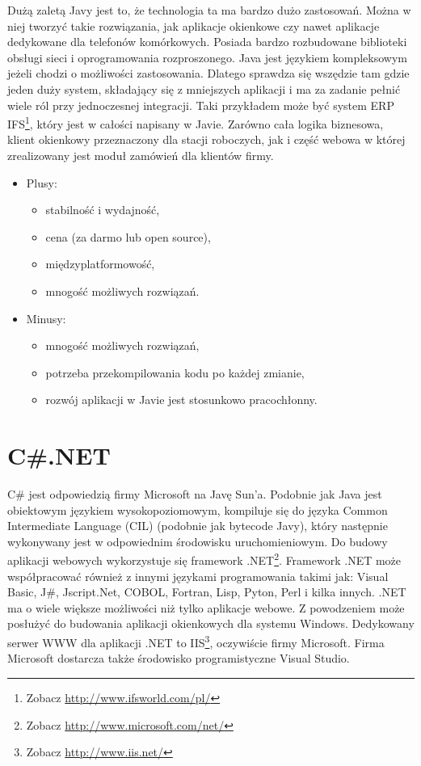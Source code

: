\documentclass[a4paper,12pt,oneside]{report}
\begin{document}
Dużą zaletą Javy jest to, że technologia ta ma bardzo dużo zastosowań. Można w niej tworzyć takie rozwiązania, jak aplikacje okienkowe czy nawet aplikacje dedykowane dla telefonów komórkowych. Posiada bardzo rozbudowane biblioteki obsługi sieci i oprogramowania rozproszonego. Java jest językiem kompleksowym jeżeli chodzi o możliwości zastosowania. Dlatego sprawdza się wszędzie tam gdzie jeden duży system, składający się z mniejszych aplikacji i ma za zadanie pełnić wiele ról przy jednoczesnej integracji. Taki przykładem może być system ERP IFS\footnote{Zobacz \url{http://www.ifsworld.com/pl/}}, który jest w całości napisany w Javie. Zarówno cała logika biznesowa, klient okienkowy przeznaczony dla stacji roboczych, jak i część webowa w której zrealizowany jest moduł zamówień dla klientów firmy.
\begin{itemize}
\item Plusy:
  \begin{itemize}
  \item stabilność i wydajność,
  \item cena (za darmo lub open source),
  \item międzyplatformowość,
  \item mnogość możliwych rozwiązań.
  \end{itemize}
\item Minusy:
  \begin{itemize}
  \item mnogość możliwych rozwiązań,
  \item potrzeba przekompilowania kodu po każdej zmianie,
  \item rozwój aplikacji w Javie jest stosunkowo pracochłonny.
  \end{itemize}
\end{itemize}

\section{C\#.NET}
\label{sec:dotnet}
C\# jest odpowiedzią firmy Microsoft na Javę Sun'a. Podobnie jak Java jest obiektowym językiem wysokopoziomowym, kompiluje się do języka Common Intermediate Language (CIL) (podobnie jak bytecode Javy), który następnie wykonywany jest w odpowiednim środowisku uruchomieniowym. Do budowy aplikacji webowych wykorzystuje się framework .NET\footnote{Zobacz \url{http://www.microsoft.com/net/}}. Framework .NET może współpracować również z innymi językami programowania takimi jak: Visual Basic, J\#, Jscript.Net, COBOL, Fortran, Lisp, Pyton, Perl i kilka innych. .NET ma o wiele większe możliwości niż tylko aplikacje webowe. Z powodzeniem może posłużyć do budowania aplikacji okienkowych dla systemu Windows. Dedykowany serwer WWW dla aplikacji .NET to IIS\footnote{Zobacz \url{http://www.iis.net/}}, oczywiście firmy Microsoft. Firma Microsoft dostarcza także środowisko programistyczne Visual Studio.
\end{document}
